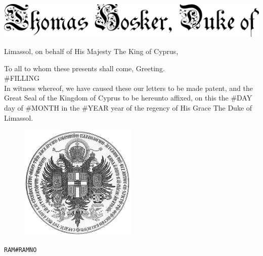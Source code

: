 \documentclass[varwidth=true,border=50pt]{standalone}
\begin{document}
\thispagestyle{fancy}

\noindent \includegraphics[width=\textwidth]{thomas_hosker_duke_of}

{\LARGE
Limassol, on behalf of His Majesty The King of Cyprus,

\hspace{20pt} To all to whom these presents shall come, Greeting.\\

\hspace{20pt} #FILLING\\

\hspace{20pt} In witness whereof, we have caused these our letters to be made patent, and the Great Seal of the Kingdom of Cyprus to be hereunto affixed, on this the #DAY day of #MONTH in the #YEAR year of the regency of His Grace The Duke of Limassol.
}

\begin{figure}[h]
\centering
\includegraphics[width=0.5\textwidth]{seal}
\end{figure}

\hfill {\footnotesize \texttt{RAM{#RAMNO}}}
\end{document}
